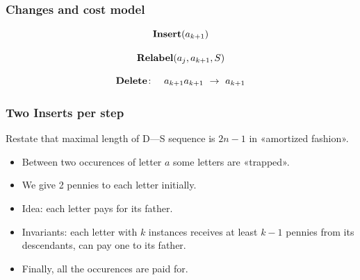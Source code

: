 \documentclass[aspectratio=1610,12pt,notheorems]{beamer}
\begin{document}
\begin{frame} \frametitle{Changes and cost model}

\begin{block}{\vspace*{-3ex}} \vspace{-2.2ex}
	$$\text{\bf Insert} (a_{k+1})$$
\end{block}

\begin{block}{\vspace*{-3ex}} \vspace{-2.2ex}
	$$\text{\bf Relabel} (a_j, a_{k+1}, S)$$
\end{block}

	$$\text{\bf Delete} \colon\quad a_{k+1}a_{k+1}\ 
	    \rightarrow\ a_{k+1}$$

\end{frame}

\begin{frame} \frametitle{Two Inserts per step}

\begin{block}{\vspace*{-3ex}}
Restate that maximal length of D—S sequence is $2n-1$ in «amortized fashion».
\end{block}

\begin{itemize}
	\item Between two occurences of letter $a$ some letters are «trapped». \medskip
	\item We give 2 pennies to each letter initially. \medskip
	\item Idea: each letter pays for its father. \medskip
	\item Invariants: each letter with $k$ instances receives at least $k-1$ pennies from its descendants, can pay one to its father. \medskip
	\item Finally, all the occurences are paid for.
\end{itemize} \vspace{1cm}
\end{frame}
\end{document}
